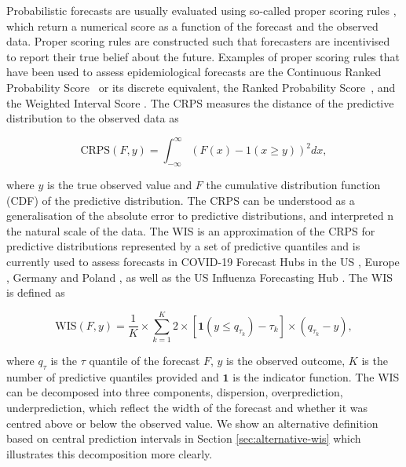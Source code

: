 \documentclass{article}
\begin{document}
Probabilistic forecasts are usually evaluated using so-called proper scoring rules \citep{gneitingStrictlyProperScoring2007}, which return a numerical score as a function of the forecast and the observed data. Proper scoring rules are constructed such that forecasters are incentivised to report their true belief about the future. Examples of proper scoring rules that have been used to assess epidemiological forecasts are the Continuous Ranked Probability Score~\citep[CRPS,][]{gneitingStrictlyProperScoring2007} or its discrete equivalent, the Ranked Probability Score~\citep[RPS,][]{funkAssessingPerformanceRealtime2019}, and the Weighted Interval Score \citep{bracherEvaluatingEpidemicForecasts2021}. 
The CRPS measures the distance of the predictive distribution to the observed data as 
\begin{linenomath*}
\begin{equation*}
    \text{CRPS}(F, y) = \int_{-\infty}^\infty \left( F(x) - 1(x \geq y) \right)^2 dx,
\end{equation*}    
\end{linenomath*}
where $y$ is the true observed value and $F$ the cumulative distribution function (CDF) of the predictive distribution. The CRPS can be understood as a generalisation of the absolute error to predictive distributions, and interpreted n the natural scale of the data. The WIS is an approximation of the CRPS for predictive distributions represented by a set of predictive quantiles and is currently used to assess forecasts in COVID-19 Forecast Hubs in the US \citep{cramerCOVID19ForecastHub2020, cramerEvaluationIndividualEnsemble2021}, Europe \citep{sherrattPredictivePerformanceMultimodel2022}, Germany and Poland \citep{bracherShorttermForecastingCOVID192021, bracherNationalSubnationalShortterm2021}, as well as the US Influenza Forecasting Hub \citep{CdcepiFlusightforecastdata2022}. The WIS is defined as 
\begin{linenomath*}
\begin{equation*}
    \text{WIS}(F, y) = \frac{1}{K} \times \sum_{k = 1}^{K} 2 \times \left[ \boldsymbol{1}(y \leq q_{\tau_k}) - \tau_k \right] \times ( q_{\tau_k} - y), 
\end{equation*}
\end{linenomath*}
where $q_{\tau}$ is the $\tau$ quantile of the forecast $F$, $y$ is the observed outcome, $K$ is the number of predictive quantiles provided and $\boldsymbol{1}$ is the indicator function. The WIS can be decomposed into three components, dispersion, overprediction, underprediction, which reflect the width of the forecast and whether it was centred above or below the observed value. We show an alternative definition based on central prediction intervals in Section \ref{sec:alternative-wis} which illustrates this decomposition more clearly. 
\end{document}
